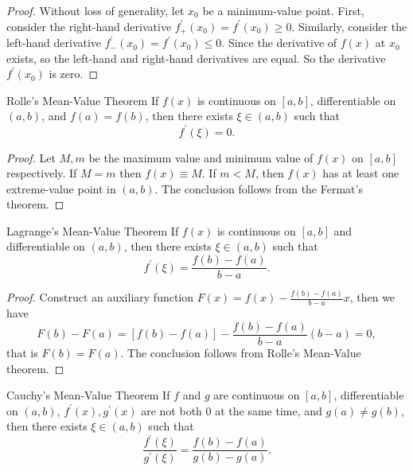 \begin{proof}
  Without loss of generality, let $x_0$ be a minimum-value point.
  First, consider the right-hand derivative $f_+^{\prime}(x_0) = f^{\prime}(x_0)
  \geq 0$.
  Similarly, consider the left-hand derivative $f_-^{\prime}(x_0) =
  f^{\prime}(x_0) \leq 0$.
  Since the derivative of $f(x)$ at $x_0$ exists,
  so the left-hand and right-hand derivatives are equal.
  So the derivative $f^{\prime}(x_0)$ is zero.
\end{proof}

\begin{theorem}{Rolle's Mean-Value Theorem}{}
  If $f(x)$ is continuous on $[a, b]$,
  differentiable on $(a, b)$,
  and $f(a) = f(b)$,
  then there exists $\xi \in (a, b)$ such that
  \begin{equation}
    f^{\prime}(\xi) = 0.
  \end{equation}
\end{theorem}

\begin{proof}
  Let $M, m$ be the maximum value and minimum value of $f(x)$ on $[a, b]$ respectively.
  If $M = m$ then $f(x) \equiv M$.
  If $m < M$, then $f(x)$ has at least one extreme-value point in $(a, b)$.
  The conclusion follows from the Fermat's theorem.
\end{proof}

\begin{theorem}{Lagrange's Mean-Value Theorem}{}
  If $f(x)$ is continuous on $[a, b]$ and differentiable on $(a, b)$,
  then there exists $\xi \in (a, b)$ such that
  \begin{equation}
    f^{\prime}(\xi) = \frac{f(b) - f(a)}{b - a}.
  \end{equation}
\end{theorem}

\begin{proof}
  Construct an auxiliary function
  $F(x) = f(x) - \frac{f(b) - f(a)}{b - a}x$,
  then we have
  \begin{equation}
    F(b) - F(a) = \left[ f(b) - f(a) \right]
    - \frac{f(b) - f(a)}{b - a}(b - a) = 0,
  \end{equation}
  that is $F(b) = F(a)$.
  The conclusion follows from Rolle's Mean-Value theorem.
\end{proof}

\begin{theorem}{Cauchy's Mean-Value Theorem}{}
  If $f$ and $g$ are continuous on $[a, b]$,
  differentiable on $(a, b)$,
  $f^{\prime}(x), g^{\prime}(x)$ are not both $0$ at the same time,
  and $g(a) \neq g(b)$, then there exists $\xi \in (a, b)$ such that
  \begin{equation}
    \frac{f^{\prime}(\xi)}{g^{\prime}(\xi)} = \frac{f(b) - f(a)}{g(b) - g(a)}.
  \end{equation}
\end{theorem}

